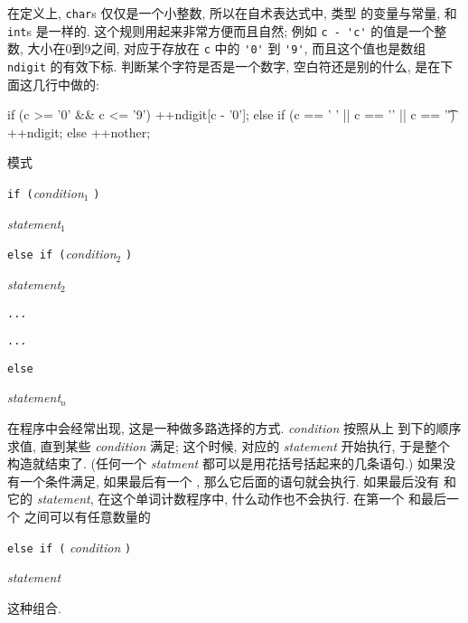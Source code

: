 在定义上, \verb"char"s 仅仅是一个小整数, 所以在自术表达式中, \cchar 类型
的变量与常量, 和 \verb"int"s 是一样的. 这个规则用起来非常方便而且自然;
例如 \verb"c - 'c'" 的值是一个整数, 大小在0到9之间, 对应于存放在 \verb"c"
中的 \verb"'0'" 到 \verb"'9'", 而且这个值也是数组 \verb"ndigit" 的有效下标.
判断某个字符是否是一个数字, 空白符还是别的什么, 是在下面这几行中做的:
\begin{myverbatim}
    if (c >= '0' && c <= '9')
        ++ndigit[c - '0'];
    else if (c == ' ' || c == '\n' || c == '\t')
        ++ndigit;
    else 
        ++nother;
\end{myverbatim}
模式    \par
\begin{mypsudo}
    \hspace{0em}\verb"if ("\textit{condition}$_1$ \verb")"      \par
    \hspace{2em}\textit{statement}$_1$                          \par 
    \hspace{0em}\verb"else if ("\textit{condition}$_2$ \verb")" \par 
    \hspace{2em}\textit{statement}$_2$                          \par 
    \hspace{2em}\verb"..."                                      \par
    \hspace{2em}\verb"..."                                      \par
    \hspace{0em}\verb"else"                                     \par 
    \hspace{2em}\textit{statement}$_n$                          \par
\end{mypsudo}
在程序中会经常出现, 这是一种做多路选择的方式. \textit{condition} 按照从上
到下的顺序求值, 直到某些 \textit{condition} 满足; 这个时候, 对应的 
\textit{statement} 开始执行, 于是整个构造就结束了. (任何一个 \textit{statment}
都可以是用花括号括起来的几条语句.) 如果没有一个条件满足, 如果最后有一个
\celse, 那么它后面的语句就会执行. 如果最后没有 \celse 和它的 \textit{statement},
在这个单词计数程序中, 什么动作也不会执行. 在第一个 \cif 和最后一个 \celse 
之间可以有任意数量的 \par
\begin{mypsudo}
    \texttt{else if (} \textit{condition} \texttt{)} \par
    \hspace{2em} \textit{statement} \par
\end{mypsudo}
这种组合.

